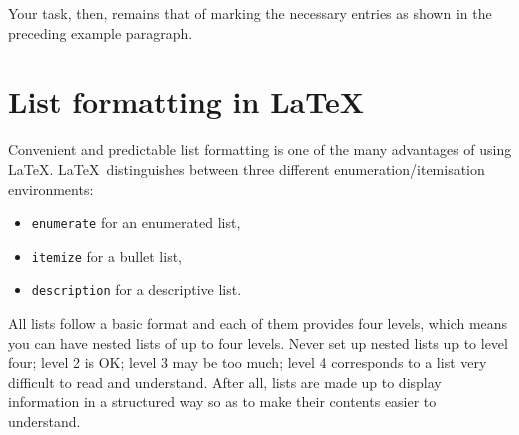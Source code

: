 Your task, then, remains that of marking the necessary entries as shown in the preceding example paragraph.



\section{List formatting in \LaTeX}\label{section 2.3}

Convenient and predictable list formatting is one of the many advantages of using \LaTeX. \LaTeX\ distinguishes between three different enumeration/itemisation environments: 
%
\begin{itemize}
	\item \texttt{enumerate} for an enumerated list,
	\item \texttt{itemize} for a bullet list,
	\item \texttt{description} for a descriptive list.
\end{itemize}
All lists follow a basic format and each of them provides four levels, which means you can have nested lists of up to four levels. Never set up nested lists up to level four; level 2 is OK; level 3 may be too much; level 4 corresponds to a list very difficult to read and understand. After all, lists are made up to display information in a structured way so as to make their contents easier to understand.

